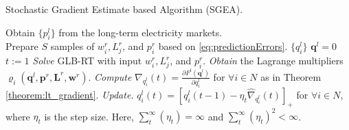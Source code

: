\renewcommand{\algorithmicrequire}{\textbf{Input:}}
\renewcommand{\algorithmicensure}{\textbf{Output:}}
\begin{algorithm}
	\caption{Stochastic Gradient Estimate based Algorithm (SGEA).}
	\label{alg:sgea}
	\begin{algorithmic}
		\REQUIRE Obtain $\{p^l_i\}$ from the long-term electricity markets. \\
		Prepare $S$ samples of $w^r_i,L^r_j$, and $p^r_i$  based on \eqref{eq:predictionErrors}.
		\ENSURE $\{q^l_i\}$
		\STATE ${\textbf{q}^l} = {0}$ 
		\STATE $t:=1 $
				\STATE \textit{Solve} GLB-RT with input $w^r_i,L^r_j$, and $p^r_i$.
				\STATE \textit{Obtain} the Lagrange multipliers $\varrho_i(\textbf{q}^l,\textbf{p}^r,\textbf{L}^r,\textbf{w}^r)$.
			\ENDFOR	
			\STATE \textit{Compute} $\nabla_{q^l_i}(t) = \frac{\partial F^l(\textbf{q}^l)} {\partial q^l_i}$ for $\forall i \in N$ as in Theorem \ref{theorem:lt_gradient}. 			 		
			\STATE \textit{Update.} $q^l_i(t) = [q^l_i(t-1) - \eta_t \hat{\nabla}_{q^l_i}(t)]_+$ for $\forall i \in N$, where $\eta_t$ is the step size. Here, $\sum_{t}^{\infty}(\eta_t) = \infty $ and $\sum_{t}^{\infty}(\eta_t)^2 < \infty$.
		\ENDWHILE
	\end{algorithmic}
\end{algorithm}